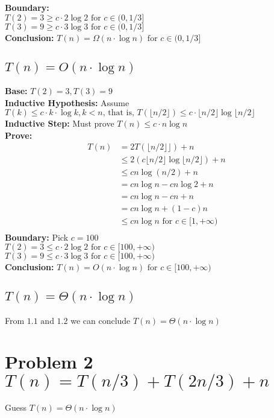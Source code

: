 \documentclass[a4paper]{article}
\begin{document}
\textbf{Boundary:} \\
$T(2)=3\geq c\cdot 2\log 2 \text{ for } c\in (0,1/3]$\\ 
$T(3)=9 \geq c\cdot 3\log3 \text{ for } c\in (0,1/3]$\\
\textbf{Conclusion: }$T(n)= \Omega(n\cdot \log n)\text{ for } c\in (0,1/3] $

\subsection{$T(n)= O(n\cdot \log n)$}

\textbf{Base:} $T(2)=3, T(3)=9$\\
\textbf{Inductive Hypothesis:} Assume $T(k)\leq c\cdot k \cdot \log{k}, k< n\text{, that is, }T(\lfloor{n/2}\rfloor)\leq c\cdot \lfloor{n/2}\rfloor\log{\lfloor{n/2}\rfloor}$\\
\textbf{Inductive Step:} Must prove $T(n)\leq c\cdot n\log{n}$\\
\textbf{Prove:}\\
\begin{align*}
    T(n) & = 2T(\lfloor{n/2}\rfloor⌋) + n \\
    & \leq 2(c\lfloor{n/2}\rfloor\log{\lfloor{n/2}\rfloor})+n \\ 
    & \leq cn\log{(n/2)}+n \\
    & = cn \log{n} -cn\log{2}+n\\
    & = cn \log n - cn+n \\
    & = cn \log n +(1-c)n \\
    & \leq cn \log n \text{ for } c\in[1,+\infty)\\
\end{align*}
\textbf{Boundary:} Pick $c=100$\\
$T(2)=3\leq c\cdot 2\log 2 \text{ for } c\in[100,+\infty)$\\ 
$T(3)=9 \leq c\cdot 3\log3 \text{ for } c\in[100,+\infty)$\\
\textbf{Conclusion: }$T(n)= O(n\cdot \log n)\text{ for } c\in[100,+\infty) $

\subsection{$T(n)= \Theta(n\cdot \log n)$}
From $1.1 \text{ and } 1.2$ we can conclude {$T(n)= \Theta(n\cdot \log n)$}

\section{Problem 2 $T(n) = T(n/3) + T(2n/3) + n$} 
Guess $T(n)=\Theta(n\cdot \log n)$
\end{document}
